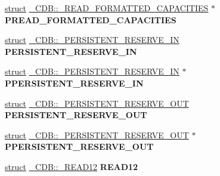 \begin{DoxyCompactItemize}
\item 
\mbox{\label{union___c_d_b_a1e2b7748e1841196b5ec3abe9be403e2}} 
\hyperlink{interfacestruct}{struct} \hyperlink{struct___c_d_b_1_1___r_e_a_d___f_o_r_m_a_t_t_e_d___c_a_p_a_c_i_t_i_e_s}{\+\_\+\+C\+D\+B\+::\+\_\+\+R\+E\+A\+D\+\_\+\+F\+O\+R\+M\+A\+T\+T\+E\+D\+\_\+\+C\+A\+P\+A\+C\+I\+T\+I\+ES} $\ast$ {\bfseries P\+R\+E\+A\+D\+\_\+\+F\+O\+R\+M\+A\+T\+T\+E\+D\+\_\+\+C\+A\+P\+A\+C\+I\+T\+I\+ES}
\item 
\mbox{\label{union___c_d_b_a71e0368c6dc87975ddb6ffa1b65a51b4}} 
\hyperlink{interfacestruct}{struct} \hyperlink{struct___c_d_b_1_1___p_e_r_s_i_s_t_e_n_t___r_e_s_e_r_v_e___i_n}{\+\_\+\+C\+D\+B\+::\+\_\+\+P\+E\+R\+S\+I\+S\+T\+E\+N\+T\+\_\+\+R\+E\+S\+E\+R\+V\+E\+\_\+\+IN} {\bfseries P\+E\+R\+S\+I\+S\+T\+E\+N\+T\+\_\+\+R\+E\+S\+E\+R\+V\+E\+\_\+\+IN}
\item 
\mbox{\label{union___c_d_b_a87090a4fdef307740cbcb4ebbe236948}} 
\hyperlink{interfacestruct}{struct} \hyperlink{struct___c_d_b_1_1___p_e_r_s_i_s_t_e_n_t___r_e_s_e_r_v_e___i_n}{\+\_\+\+C\+D\+B\+::\+\_\+\+P\+E\+R\+S\+I\+S\+T\+E\+N\+T\+\_\+\+R\+E\+S\+E\+R\+V\+E\+\_\+\+IN} $\ast$ {\bfseries P\+P\+E\+R\+S\+I\+S\+T\+E\+N\+T\+\_\+\+R\+E\+S\+E\+R\+V\+E\+\_\+\+IN}
\item 
\mbox{\label{union___c_d_b_acb21003a8e7c618abae138ad2d72ef9a}} 
\hyperlink{interfacestruct}{struct} \hyperlink{struct___c_d_b_1_1___p_e_r_s_i_s_t_e_n_t___r_e_s_e_r_v_e___o_u_t}{\+\_\+\+C\+D\+B\+::\+\_\+\+P\+E\+R\+S\+I\+S\+T\+E\+N\+T\+\_\+\+R\+E\+S\+E\+R\+V\+E\+\_\+\+O\+UT} {\bfseries P\+E\+R\+S\+I\+S\+T\+E\+N\+T\+\_\+\+R\+E\+S\+E\+R\+V\+E\+\_\+\+O\+UT}
\item 
\mbox{\label{union___c_d_b_adae558d9f599606891d8e27878ac9174}} 
\hyperlink{interfacestruct}{struct} \hyperlink{struct___c_d_b_1_1___p_e_r_s_i_s_t_e_n_t___r_e_s_e_r_v_e___o_u_t}{\+\_\+\+C\+D\+B\+::\+\_\+\+P\+E\+R\+S\+I\+S\+T\+E\+N\+T\+\_\+\+R\+E\+S\+E\+R\+V\+E\+\_\+\+O\+UT} $\ast$ {\bfseries P\+P\+E\+R\+S\+I\+S\+T\+E\+N\+T\+\_\+\+R\+E\+S\+E\+R\+V\+E\+\_\+\+O\+UT}
\item 
\mbox{\label{union___c_d_b_a219cfc9117502f7870e7945414b645d5}} 
\hyperlink{interfacestruct}{struct} \hyperlink{struct___c_d_b_1_1___r_e_a_d12}{\+\_\+\+C\+D\+B\+::\+\_\+\+R\+E\+A\+D12} {\bfseries R\+E\+A\+D12}

\end{DoxyCompactItemize}
